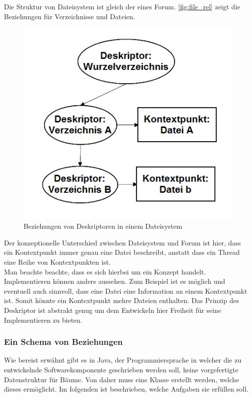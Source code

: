 \documentclass[a4paper]{article}
\begin{document}
	Die Struktur von Dateisystem ist gleich der eines Forum. \autoref{fig:file_rel}
	zeigt die Beziehungen für Verzeichnisse und Dateien.
	
	\begin{figure}[H]
		\includegraphics[width=\linewidth]{../Bilder/file_rel.jpg}
		\caption{Beziehungen von Deskriptoren in einem Dateisystem}
		\label{fig:file_rel}
	\end{figure}	
	
	Der konzeptionelle Unterschied zwischen Dateisystem und Forum ist hier, 
	dass ein Kontextpunkt immer genau eine Datei beschreibt, anstatt dass ein
	Thread eine Reihe von Kontextpunkten ist.\\
	
	Man beachte beachte, dass es sich hierbei um ein Konzept handelt.
	Implementieren können anders aussehen. Zum Beispiel ist es möglich und
	eventuell auch sinnvoll, dass eine Datei eine Information an einem Kontextpunkt
	ist. Somit könnte ein Kontextpunkt mehre Dateien enthalten. Das Prinzip des
	Deskriptor ist abstrakt genug um dem Entwickeln hier Freiheit für seine
	Implementieren zu bieten.
	
	\subsubsection{Ein Schema von Beziehungen}
	
	Wie bereist erwähnt gibt es in Java, der Programmiersprache in welcher die 
	zu entwickelnde Softwarekomponente geschrieben werden soll, keine vorgefertigte
	Datenstruktur für Bäume. Von daher muss eine Klasse erstellt werden, welche
	dieses ermöglicht. Im folgenden ist beschrieben, welche Aufgaben sie erfüllen
	soll.
	
\end{document}
